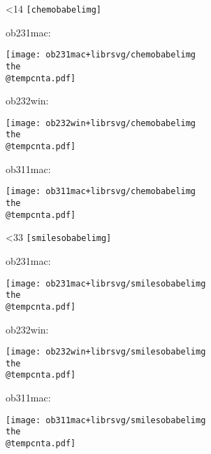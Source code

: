 \documentclass{article}
\begin{document}
\centering

\makeatletter
{}
\loop\ifnum\@tempcnta<14\relax
  \advance\@tempcnta\@ne
  \texttt{[chemobabelimg\the\@tempcnta]}\par
  ob231mac:\par
  \texttt{[image: ob231mac+librsvg/chemobabelimg\\the\\@tempcnta.pdf]}\par
  ob232win:\par
  \texttt{[image: ob232win+librsvg/chemobabelimg\\the\\@tempcnta.pdf]}\par
  ob311mac:\par
  \texttt{[image: ob311mac+librsvg/chemobabelimg\\the\\@tempcnta.pdf]}\par
  \newpage
\repeat
{}
\loop\ifnum\@tempcnta<33\relax
  \advance\@tempcnta\@ne
  \texttt{[smilesobabelimg\the\@tempcnta]}\par
  ob231mac:\par
  \texttt{[image: ob231mac+librsvg/smilesobabelimg\\the\\@tempcnta.pdf]}\par
  ob232win:\par
  \texttt{[image: ob232win+librsvg/smilesobabelimg\\the\\@tempcnta.pdf]}\par
  ob311mac:\par
  \texttt{[image: ob311mac+librsvg/smilesobabelimg\\the\\@tempcnta.pdf]}\par
  \newpage
\repeat
\makeatother
\end{document}
